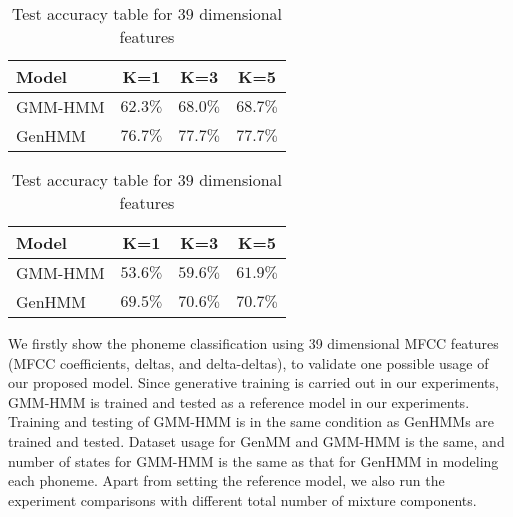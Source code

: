 \documentclass[letterpaper]{article} %
\begin{document}
\begin{table}
  \caption{Test accuracy table for $39$ dimensional features }\label{tab:acc-classification39f}
  \vspace{-0.3cm}
  \centering
  \label{tab:acc-classification39f_a}
  \vspace{-0.1cm}
  \centering  
  \begin{tabular}{l|c|c|c}
    \toprule
    {Model} &  K=1 &  K=3 &  K=5  \\  \midrule
    GMM-HMM & $62.3\%$ &  $68.0\%$ &  $68.7\%$  \\ \midrule
    GenHMM & $76.7\%$ & $77.7\%$ &  $77.7\%$ \\ 
    \bottomrule                                                                  
  \end{tabular}
  \vspace{0.1cm}
  \label{tab:acc-classification39f_b}
  \vspace{-0.1cm}
  \begin{tabular}{l|c|c|c} \toprule
    {Model} &  K=1 &  K=3 &  K=5
    \\ \midrule
    GMM-HMM & $53.6\%$ &  $59.6\%$ & $61.9\%$  \\ \midrule
    GenHMM & $69.5\%$ & $70.6\%$ & $70.7\%$   \\ 
    \bottomrule
  \end{tabular}
  \vspace{0.3cm}
\end{table}

We firstly show the phoneme classification using 39 dimensional MFCC features (MFCC coefficients, deltas, and delta-deltas), to validate one possible usage of our proposed model. Since generative training is carried out in our experiments, GMM-HMM is trained and tested as a reference model in our experiments. Training and testing of GMM-HMM is in the same condition as GenHMMs are trained and tested. Dataset usage for GenMM and GMM-HMM is the same, and number of states for GMM-HMM is the same as that for GenHMM in modeling each phoneme. Apart from setting the reference model, we also run the experiment comparisons with different total number of mixture components.
\end{document}
